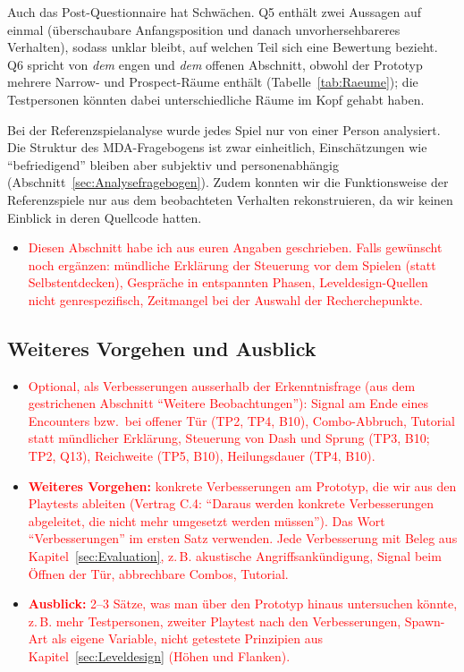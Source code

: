 \documentclass[../Main.tex]{subfiles}
\begin{document}
Auch das Post-Questionnaire hat Schwächen. Q5 enthält zwei Aussagen auf einmal (überschaubare Anfangsposition und danach unvorhersehbareres Verhalten), sodass unklar bleibt, auf welchen Teil sich eine Bewertung bezieht. Q6 spricht von \emph{dem} engen und \emph{dem} offenen Abschnitt, obwohl der Prototyp mehrere Narrow- und Prospect-Räume enthält (Tabelle~\ref{tab:Raeume}); die Testpersonen könnten dabei unterschiedliche Räume im Kopf gehabt haben.

Bei der Referenzspielanalyse wurde jedes Spiel nur von einer Person analysiert. Die Struktur des MDA-Fragebogens ist zwar einheitlich, Einschätzungen wie \enquote{befriedigend} bleiben aber subjektiv und personenabhängig (Abschnitt~\ref{sec:Analysefragebogen}). Zudem konnten wir die Funktionsweise der Referenzspiele nur aus dem beobachteten Verhalten rekonstruieren, da wir keinen Einblick in deren Quellcode hatten.

\begin{itemize}[leftmargin=1.5cm]
    \item \textcolor{red}{Diesen Abschnitt habe ich aus euren Angaben geschrieben. Falls gewünscht noch ergänzen: mündliche Erklärung der Steuerung vor dem Spielen (statt Selbstentdecken), Gespräche in entspannten Phasen, Leveldesign-Quellen nicht genrespezifisch, Zeitmangel bei der Auswahl der Recherchepunkte.}
\end{itemize}

\subsection{Weiteres Vorgehen und Ausblick} \label{sec:Verbesserungen}

\begin{itemize}[leftmargin=1.5cm]
    \item \textcolor{red}{Optional, als Verbesserungen ausserhalb der Erkenntnisfrage (aus dem gestrichenen Abschnitt \enquote{Weitere Beobachtungen}): Signal am Ende eines Encounters bzw.\ bei offener Tür (TP2, TP4, B10), Combo-Abbruch, Tutorial statt mündlicher Erklärung, Steuerung von Dash und Sprung (TP3, B10; TP2, Q13), Reichweite (TP5, B10), Heilungsdauer (TP4, B10).}
\end{itemize}

\begin{itemize}[leftmargin=1.5cm]
    \item \textcolor{red}{\textbf{Weiteres Vorgehen:} konkrete Verbesserungen am Prototyp, die wir aus den Playtests ableiten (Vertrag C.4: \enquote{Daraus werden konkrete Verbesserungen abgeleitet, die nicht mehr umgesetzt werden müssen}). Das Wort \enquote{Verbesserungen} im ersten Satz verwenden. Jede Verbesserung mit Beleg aus Kapitel~\ref{sec:Evaluation}, z.\,B. akustische Angriffsankündigung, Signal beim Öffnen der Tür, abbrechbare Combos, Tutorial.}
    \item \textcolor{red}{\textbf{Ausblick:} 2--3 Sätze, was man über den Prototyp hinaus untersuchen könnte, z.\,B. mehr Testpersonen, zweiter Playtest nach den Verbesserungen, Spawn-Art als eigene Variable, nicht getestete Prinzipien aus Kapitel~\ref{sec:Leveldesign} (Höhen und Flanken).}
\end{itemize}
\end{document}
